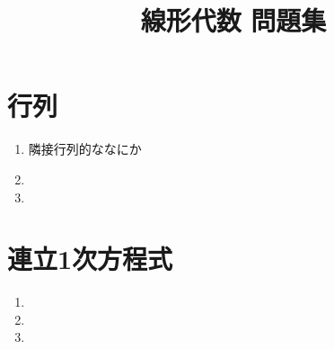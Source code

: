 \documentclass[11pt, uplatex, dvipdfmx, twoside]{jsarticle}
\title{\Huge 線形代数 問題集}
\begin{document}
\maketitle
\thispagestyle{empty}

\newpage

\section{行列}\label{sec:matrix}

\begin{enumerate}[label=\ref{sec:matrix}.\arabic*]
  \setlength{\itemsep}{1zh}
  
\item 隣接行列的ななにか

\item

\item

\end{enumerate}

\section{連立1次方程式}\label{sec:system}

\begin{enumerate}[label=\ref{sec:system}.\arabic*]
  \setlength{\itemsep}{1zh}
\item

\item

\item
  
\end{enumerate}
\end{document}
